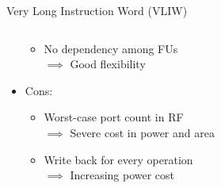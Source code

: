 \documentclass{beamer}
\begin{document}
\begin{CJK}{UTF8}{bkai}
\begin{frame}{Very Long Instruction Word (VLIW)}
\begin{columns}
\begin{column}{0.6\textwidth}
\begin{itemize}
{\begin{itemize}
                                        \item No dependency among FUs \\ $\implies$ Good flexibility
                                    \end{itemize}
                                }
                            \item <4-> {Cons:
                                    \begin{itemize}
                                        \item Worst-case port count in RF \\ $\implies$ Severe cost in power and area
                                        \item Write back for every operation \\ $\implies$ Increasing power cost
                                    \end{itemize}
                                }
                        \end{itemize} 
                    \end{column}
                \end{columns} 
            \end{frame}


\end{CJK}
\end{document}
